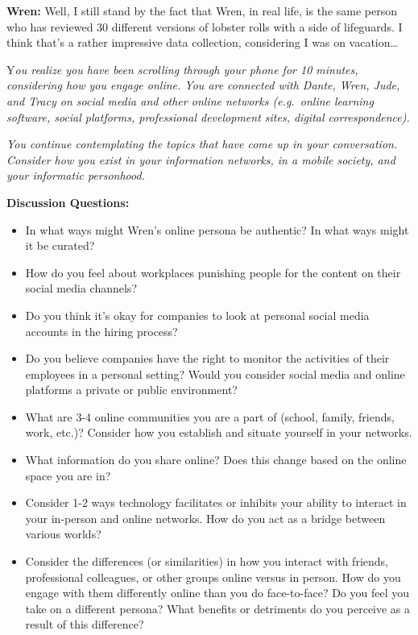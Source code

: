 \documentclass[
  letterpaper,
  DIV=11,
  numbers=noendperiod]{scrreprt}
\begin{document}
\textbf{Wren:} Well, I still stand by the fact that Wren, in real life,
is the same person who has reviewed 30 different versions of lobster
rolls with a side of lifeguards. I think that's a rather impressive data
collection, considering I was on vacation\ldots{}

Y\emph{ou realize you have been scrolling through your phone for 10
minutes, considering how you engage online. You are connected with
Dante, Wren, Jude, and Tracy on social media and other online networks
(e.g.~online learning software, social platforms, professional
development sites, digital correspondence).}

\emph{You continue contemplating the topics that have come up in your
conversation. Consider how you exist in your information networks, in a
mobile society, and your informatic personhood.}

\textbf{Discussion Questions:}

\begin{itemize}
\item
  In what ways might Wren's online persona be authentic? In what ways
  might it be curated? ~
\item
  How do you feel about workplaces punishing people for the content on
  their social media channels?
\item
  Do you think it's okay for companies to look at personal social media
  accounts in the hiring process?
\item
  Do you believe companies have the right to monitor the activities of
  their employees in a personal setting? Would you consider social media
  and online platforms a private or public environment?
\item
  What are 3-4 online communities you are a part of (school, family,
  friends, work, etc.)? Consider how you establish and situate yourself
  in your networks.
\item
  What information do you share online? Does this change based on the
  online space you are in?
\item
  Consider 1-2 ways technology facilitates or inhibits your ability to
  interact in your in-person and online networks. How do you act as a
  bridge between various worlds?
\item
  Consider the differences (or similarities) in how you interact with
  friends, professional colleagues, or other groups online versus in
  person. How do you engage with them differently online than you do
  face-to-face? Do you feel you take on a different persona? What
  benefits or detriments do you perceive as a result of this difference?
\end{itemize}
\end{document}
